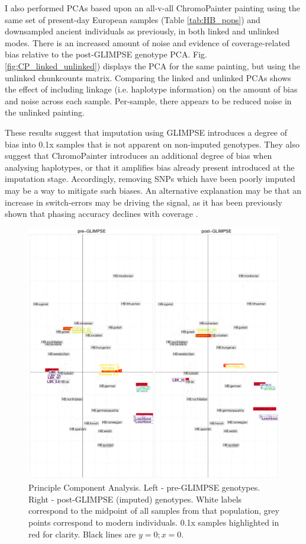 {I also performed PCAs based upon an all-v-all ChromoPainter painting using the same set of present-day European samples (Table \ref{tab:HB_pops}) and downsampled ancient individuals as previously, in both linked and unlinked modes. There is an increased amount of noise and evidence of coverage-related bias relative to the post-GLIMPSE genotype PCA. Fig. \ref{fig:CP_linked_unlinked}) displays the PCA for the same painting, but using the unlinked chunkcounts matrix. Comparing the linked and unlinked PCAs shows the effect of including linkage (i.e. haplotype information) on the amount of bias and noise across each sample. Per-sample, there appears to be reduced noise in the unlinked painting.

These results suggest that imputation using GLIMPSE introduces a degree of bias into 0.1x samples that is not apparent on non-imputed genotypes. They also suggest that ChromoPainter introduces an additional degree of bias when analysing haplotypes, or that it amplifies bias already present introduced at the imputation stage. Accordingly, removing SNPs which have been poorly imputed may be a way to mitigate such biases. An alternative explanation may be that an increase in switch-errors may be driving the signal, as it has been previously shown that phasing accuracy declines with coverage \cite{delaneau2018integrative}.

\begin{figure}[htp]
    \centering
    \includegraphics[width=1.0\textwidth]{../images/chapter1/pre_post_GLIMPSE_PCA.pdf}
    \caption{Principle Component Analysis. Left - pre-GLIMPSE genotypes. Right - post-GLIMPSE (imputed) genotypes. White labels correspond to the midpoint of all samples from that population, grey points correspond to modern individuals. 0.1x samples highlighted in red for clarity. Black lines are $y=0; x=0$.}
    \label{fig:pre_GLIMPSE_PCA}
\end{figure}

}
